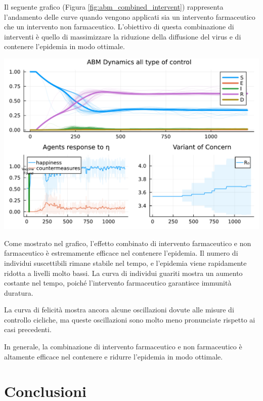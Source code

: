 Il seguente grafico (Figura \ref{fig:abm_combined_intervent}) 
rappresenta l'andamento delle curve quando vengono applicati sia 
un intervento farmaceutico che un intervento non farmaceutico. 
L'obiettivo di questa combinazione di interventi è quello di 
massimizzare la riduzione della diffusione del virus e di contenere 
l'epidemia in modo ottimale.

\begin{minipage}{\linewidth}
    \centering
    \includegraphics[width=\textwidth]{img/SocialNetworkABM_ALL.pdf}
    \label{fig:abm_combined_intervent}
\end{minipage}

Come mostrato nel grafico, l'effetto combinato di intervento 
farmaceutico e non farmaceutico è estremamente efficace nel 
contenere l'epidemia. Il numero di individui suscettibili 
rimane stabile nel tempo, e l'epidemia viene rapidamente ridotta 
a livelli molto bassi. La curva di individui guariti mostra un 
aumento costante nel tempo, poiché l'intervento farmaceutico 
garantisce immunità duratura.

La curva di felicità mostra ancora alcune oscillazioni dovute 
alle misure di controllo cicliche, ma queste oscillazioni sono 
molto meno pronunciate rispetto ai casi precedenti.

In generale, la combinazione di intervento farmaceutico e non 
farmaceutico è altamente efficace nel contenere e ridurre 
l'epidemia in modo ottimale.
\newpage

\section{Conclusioni}

